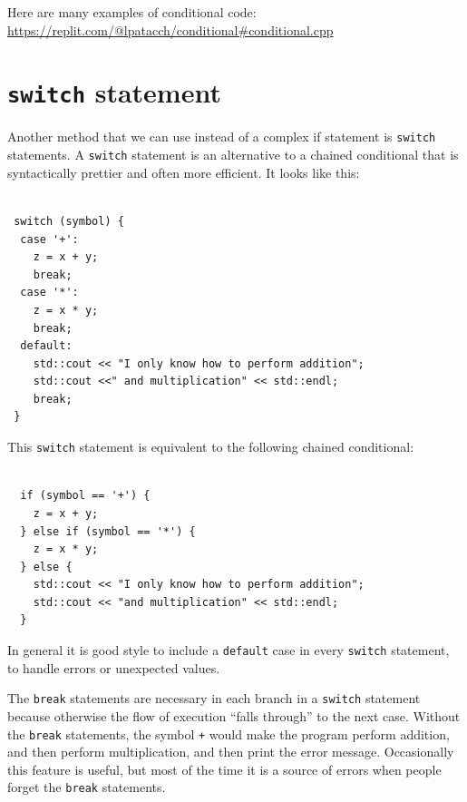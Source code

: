 Here are many examples of conditional code: 
\url{https://replit.com/@lpatacch/conditional#conditional.cpp}
\section{{\tt switch} statement}
\label{switch}

Another method that we can use instead of a complex if statement is {\tt switch}
statements.  A {\tt switch} statement
is an alternative to a chained conditional that is syntactically
prettier and often more efficient.  It looks like this:

\begin{lstlisting}
  
 switch (symbol) {
  case '+':
    z = x + y;
    break;
  case '*':
    z = x * y;
    break;
  default:
    std::cout << "I only know how to perform addition";
    std::cout <<" and multiplication" << std::endl;
    break;
 }
\end{lstlisting}
%
This {\tt switch} statement is equivalent to the following chained
conditional:

\begin{lstlisting}
  
  if (symbol == '+') {
    z = x + y;
  } else if (symbol == '*') {
    z = x * y;
  } else {
    std::cout << "I only know how to perform addition";
    std::cout << "and multiplication" << std::endl;
  }
\end{lstlisting}
%
In general it is good style to include a {\tt default} case in
every {\tt switch} statement, to handle errors or unexpected values.

The {\tt break} statements are necessary in each branch
in a {\tt switch} statement because otherwise the flow of execution
``falls through'' to the next case.  Without the {\tt break} statements,
the symbol {\tt +} would make the program perform addition, and
then perform multiplication, and then print the error message.
Occasionally this feature is useful, but most of the time it is
a source of errors when people forget the {\tt break} statements.


